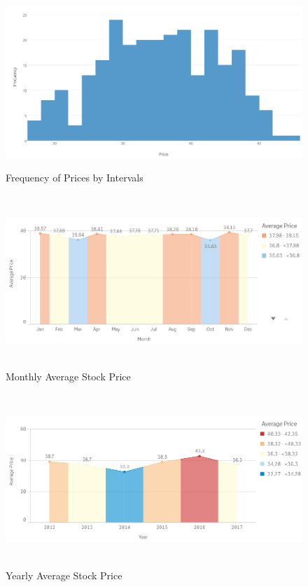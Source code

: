 \begin{figure}
\center
\includegraphics[width=13.5cm,height=6.5cm]{Figures/walmexHistogram.PNG}
\caption{Frequency of Prices by Intervals}
\label{fig:walmexFreq}
\end{figure}

\begin{figure}
\center
\includegraphics[width=14.5cm,height=6.5cm]{Figures/walmexMonth.PNG}
\caption{Monthly Average Stock Price}
\label{fig:walmexMonth}
\end{figure}

\begin{figure}
\center
\includegraphics[width=14.5cm,height=6.5cm]{Figures/walmexYear.PNG}
\caption{Yearly Average Stock Price}
\label{fig:walmexYear}
\end{figure}

